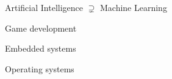 \begin{frame}{Artificial Intelligence $\supsetneq$ Machine Learning}


    \note{

    }
\end{frame}

\begin{frame}{Game development}


    \note{

    }
\end{frame}

\begin{frame}{Embedded systems}


    \note{

    }
\end{frame}

\begin{frame}{Operating systems}


    \note{

    }
\end{frame}
